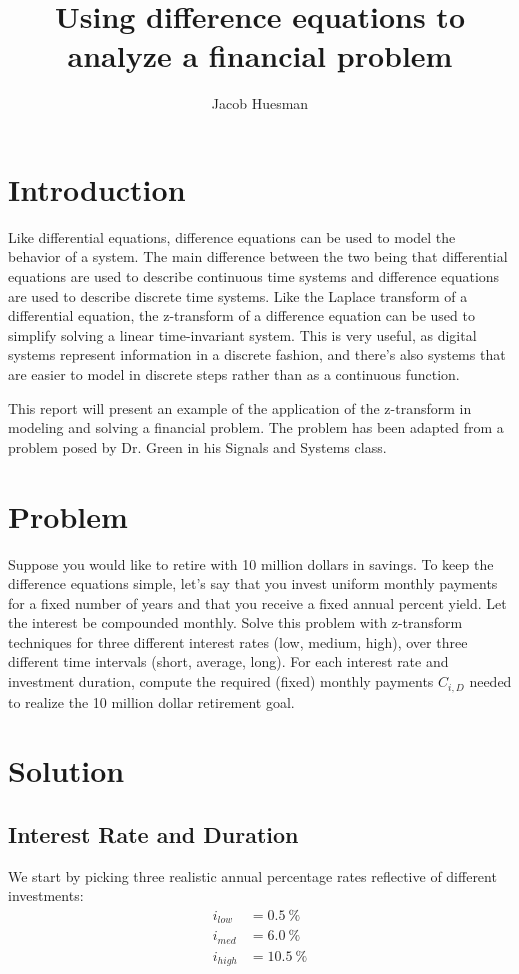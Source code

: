 \documentclass[letterpaper]{article}
\author{Jacob Huesman}
\title{Using difference equations to analyze a financial problem}
\begin{document}
\maketitle


\section{Introduction}
Like differential equations, difference equations can be used to model the behavior of a system. The main difference between the two being that differential equations are used to describe continuous time systems and difference equations are used to describe discrete time systems. Like the Laplace transform of a differential equation, the z-transform of a difference equation can be used to simplify solving a linear time-invariant system. This is very useful, as digital systems represent information in a discrete fashion, and there's also systems that are easier to model in discrete steps rather than as a continuous function.

This report will present an example of the application of the z-transform in modeling and solving a financial problem. The problem has been adapted from a problem posed by Dr. Green in his Signals and Systems class.

\section{Problem}
Suppose you would like to retire with 10 million dollars in savings. To keep the difference equations simple, let's say that you invest uniform monthly payments for a fixed number of years and that you receive a fixed annual percent yield. Let the interest be compounded monthly. Solve this problem with z-transform techniques for three different interest rates (low, medium, high), over three different time intervals (short, average, long). For each interest rate and investment duration, compute the required (fixed) monthly payments $C_{i,D}$ needed to realize the 10 million dollar retirement goal.

\section{Solution}
\subsection{Interest Rate and Duration}
We start by picking three realistic annual percentage rates reflective of different investments:
\begin{align*}
	i_{low}  &= \SI{0.5}{\%}  \\
	i_{med}  &= \SI{6.0}{\%}  \\
	i_{high} &= \SI{10.5}{\%}
\end{align*}
\end{document}
